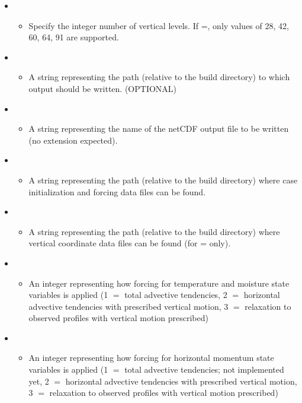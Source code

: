 \begin{itemize}
\begin{itemize}
	\end{itemize}
\item {}
	\begin{itemize}
	\item Specify the integer number of vertical levels. If =, only values of 28, 42, 60, 64, 91 are supported.
	\end{itemize}
\item {}
	\begin{itemize}
	\item A string representing the path (relative to the build directory) to which output should be written. (OPTIONAL)
	\end{itemize}
\item {}
	\begin{itemize}
	\item A string representing the name of the netCDF output file to be written (no  extension expected).
	\end{itemize}
\item {}
	\begin{itemize}
	\item A string representing the path (relative to the build directory) where case initialization and forcing data files can be found.
	\end{itemize}
\item {}
	\begin{itemize}
	\item A string representing the path (relative to the build directory) where vertical coordinate data files can be found (for = only).
	\end{itemize}
\item {}
	\begin{itemize}
	\item An integer representing how forcing for temperature and moisture state variables is applied (1 $=$ total advective tendencies, 2 $=$ horizontal advective tendencies with prescribed vertical motion, 3 $=$ relaxation to observed profiles with vertical motion prescribed)
	\end{itemize}
\item {}
	\begin{itemize}
	\item An integer representing how forcing for horizontal momentum state variables is applied (1 $=$ total advective tendencies; not implemented yet, 2 $=$ horizontal advective tendencies with prescribed vertical motion, 3 $=$ relaxation to observed profiles with vertical motion prescribed)

\end{itemize}
\end{itemize}
